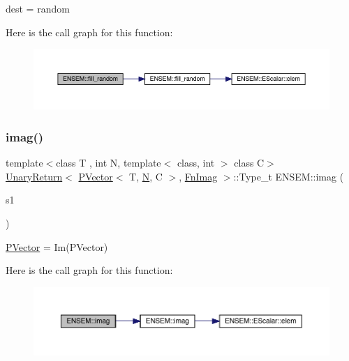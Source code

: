 dest = random 

Here is the call graph for this function\+:\nopagebreak
\begin{figure}[H]
\begin{center}
\leavevmode
\includegraphics[width=350pt]{d3/dc4/group__primvector_ga3170048baaf649f10798f2d8e0b41c86_cgraph}
\end{center}
\end{figure}
\mbox{\label{group__primvector_ga29974958f6885a4267cae10b6bec2344}} 
\subsubsection{\texorpdfstring{imag()}{imag()}}
{\footnotesize\ttfamily template$<$class T , int N, template$<$ class, int $>$ class C$>$ \\
\mbox{\hyperlink{structENSEM_1_1UnaryReturn}{Unary\+Return}}$<$ \mbox{\hyperlink{classENSEM_1_1PVector}{P\+Vector}}$<$ T, \mbox{\hyperlink{operator__name__util_8cc_a7722c8ecbb62d99aee7ce68b1752f337}{N}}, C $>$, \mbox{\hyperlink{structENSEM_1_1FnImag}{Fn\+Imag}} $>$\+::Type\+\_\+t E\+N\+S\+E\+M\+::imag (\begin{DoxyParamCaption}\item[{const \mbox{\hyperlink{classENSEM_1_1PVector}{P\+Vector}}$<$ T, \mbox{\hyperlink{operator__name__util_8cc_a7722c8ecbb62d99aee7ce68b1752f337}{N}}, C $>$ \&}]{s1 }\end{DoxyParamCaption})\hspace{0.3cm}{\ttfamily [inline]}}



\mbox{\hyperlink{classENSEM_1_1PVector}{P\+Vector}} = Im(\+P\+Vector) 

Here is the call graph for this function\+:\nopagebreak
\begin{figure}[H]
\begin{center}
\leavevmode
\includegraphics[width=350pt]{d3/dc4/group__primvector_ga29974958f6885a4267cae10b6bec2344_cgraph}
\end{center}
\end{figure}
\mbox{\label{group__primvector_gabdc482461364fd471e22ddd6c0e1c2dd}} 
